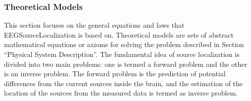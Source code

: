 \documentclass[12pt]{article}
\renewcommand{\progname}{EEGSourceLocalization}
\begin{document}
\subsubsection{Theoretical Models}\label{sec_theoretical}


This section focuses on the general equations and laws that \progname{} is based on. Theoretical models are sets of abstract mathematical equations or axioms for solving the problem described in Section ``Physical System Description''. The fundamental idea of source localization is divided into two main problems: one is termed a forward problem and the other is an inverse problem. The forward problem is the prediction of potential differences from the current sources inside the brain, and the estimation of the location of the sources from the measured data is termed as inverse problem.%

~\newline
\end{document}
